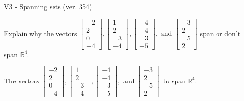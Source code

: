 \begin{exercise}
  \begin{exerciseTitle}V3 - Spanning sets (ver. 354)\end{exerciseTitle}
  \begin{exerciseStatement}
    Explain why the vectors \(\left[\begin{array}{r}
-2 \\
2 \\
0 \\
-4
\end{array}\right] , \left[\begin{array}{r}
1 \\
2 \\
-3 \\
-4
\end{array}\right] , \left[\begin{array}{r}
-4 \\
-4 \\
-3 \\
-5
\end{array}\right] , \text{ and } \left[\begin{array}{r}
-3 \\
2 \\
-5 \\
2
\end{array}\right]\) span or don't span \(\mathbb{R}^4\). 
	


  \end{exerciseStatement}
  \begin{exerciseAnswer}
   The vectors \(\left[\begin{array}{r}
-2 \\
2 \\
0 \\
-4
\end{array}\right] , \left[\begin{array}{r}
1 \\
2 \\
-3 \\
-4
\end{array}\right] , \left[\begin{array}{r}
-4 \\
-4 \\
-3 \\
-5
\end{array}\right] , \text{ and } \left[\begin{array}{r}
-3 \\
2 \\
-5 \\
2
\end{array}\right]\) 
  	 do  
	span \(\mathbb{R}^4\).
  


  \end{exerciseAnswer}
\end{exercise}